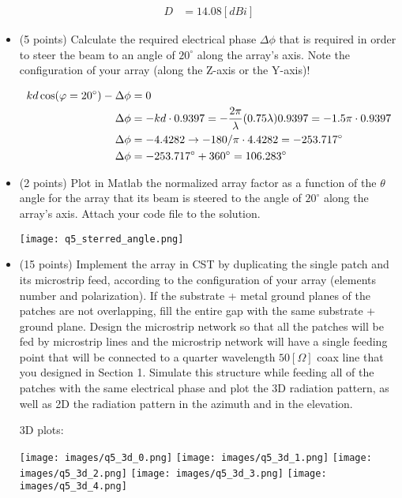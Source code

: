 \documentclass[12pt, letterpaper]{article}
\begin{document}
\begin{itemize}
  \begin{align}
    D
    &=
    14.08[dBi]
  \end{align}


  \item (5 points) Calculate the required electrical phase $\Delta\phi$ that is required in order to steer the beam to an angle of $20^{\circ}$ along the array's axis. Note the configuration of your array (along the Z-axis or the Y-axis)!

  \begin{align}
    kd\cos(\varphi=20^{\circ})-\Delta\phi
    &=
    0
    \\
    \Delta\phi
    &=
    -kd\cdot0.9397
    =
    -{2\pi\over\lambda}(0.75\lambda)0.9397
    =
    -1.5\pi\cdot0.9397
    \\
    \Delta\phi
    &=
    -4.4282
    \rightarrow
    -180/\pi\cdot4.4282=-253.717^{\circ}
    \\
    \Delta\phi
    &=
    -253.717^{\circ}+360^\circ=106.283^\circ
  \end{align}


  \item (2 points) Plot in Matlab the normalized array factor as a function of the $\theta$ angle for the array that its beam is steered to the angle of $20^{\circ}$ along the array's axis. Attach your code file to the solution.

  \texttt{[image: q5\_sterred\_angle.png]}

  \item (15 points) Implement the array in CST by duplicating the single patch and its microstrip feed, according to the configuration of your array (elements number and polarization). If the substrate + metal ground planes of the patches are not overlapping, fill the entire gap with the same substrate + ground plane. Design the microstrip network so that all the patches will be fed by microstrip lines and the microstrip network will have a single feeding point that will be connected to a quarter wavelength $50[\Omega]$ coax line that you designed in Section 1. Simulate this structure while feeding all of the patches with the same electrical phase and plot the 3D radiation pattern, as well as 2D the radiation pattern in the azimuth and in the elevation.

  \begin{center}
    3D plots:
  \end{center}

  \texttt{[image: images/q5\_3d\_0.png]}
  \texttt{[image: images/q5\_3d\_1.png]}
  \texttt{[image: images/q5\_3d\_2.png]}
  \texttt{[image: images/q5\_3d\_3.png]}
  \texttt{[image: images/q5\_3d\_4.png]}


\end{itemize}
\end{document}
